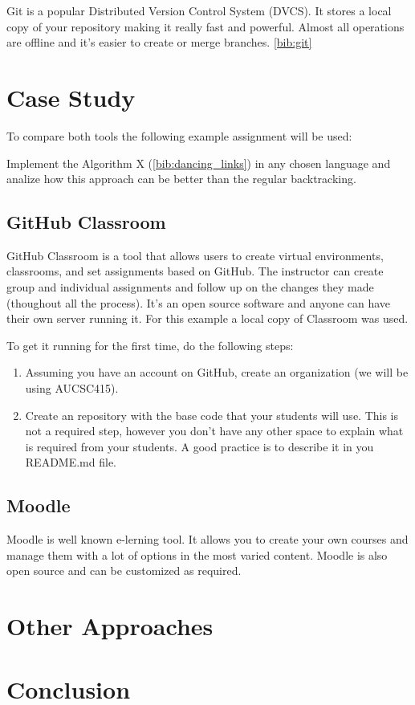 \documentclass[12pt]{article}
\begin{document}
Git is a popular Distributed Version Control System (DVCS). It stores a local copy of your repository making it really fast and powerful. Almost all operations are offline and it's easier to create or merge branches. \ref{bib:git}


\section{Case Study}

To compare both tools the following example assignment will be used: 

Implement the Algorithm X (\ref{bib:dancing_links}) in any chosen language and analize how this approach can be better than the regular backtracking.

\subsection{GitHub Classroom}

GitHub Classroom is a tool that allows users to create virtual environments, classrooms, and set assignments based on GitHub. The instructor can create group and individual assignments and follow up on the changes they made (thoughout all the process). It's an open source software and anyone can have their own server running it. For this example a local copy of Classroom was used.

To get it running for the first time, do the following steps:

\begin{enumerate}

\item Assuming you have an account on GitHub, create an organization (we will be using AUCSC415).

\item Create an repository with the base code that your students will use. This is not a required step, however you don't have any other space to explain what is required from your students. A good practice is to describe it in you README.md file.

\end{enumerate}

\subsection{Moodle}

Moodle is well known e-lerning tool. It allows you to create your own courses and manage them with a lot of options in the most varied content. Moodle is also open source and can be customized as required.


\section{Other Approaches}

\section{Conclusion}
\end{document}
